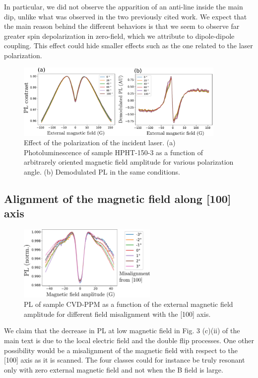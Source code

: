 \documentclass[preprintnumbers,amsmath,amssymb,onecolumn,12pt]{revtex4-2}\usepackage{graphicx}%
\begin{document}
In particular, we did not observe the apparition of an anti-line inside the main dip, unlike what was observed in the two previously cited work. We expect that the main reason behind the different behaviors is that we seem to observe far greater spin depolarization in zero-field, which we attribute to dipole-dipole coupling. This effect could hide smaller effects such as the one related to the laser polarization.
\begin{figure}[h]
\includegraphics[width=0.9\textwidth]{Figures_SI/fig_Pola}
\caption{Effect of the polarization of the incident laser. (a) Photoluminescence of sample HPHT-150-3 as a function of arbitrarely oriented magnetic field amplitude for various polarization angle. (b) Demodulated PL in the same conditions.}
\label{Pola}
\end{figure}
\subsection{Alignment of the magnetic field along [100] axis}
\begin{figure}[h]
\centering
\includegraphics[width=0.6\textwidth]{Figures_SI/alignement}
\caption{PL of sample CVD-PPM as a function of the external magnetic field amplitude for different field misalignment with the [100] axis.}
\label{Alignment}
\end{figure}
We claim that the decrease in PL at low magnetic field in Fig. 3 (c)(ii) of the main text is due to the local electric field and the double flip processes. One other possibility would be a misalignment of the magnetic field with respect to the [100] axis as it is scanned. The four classes could for instance be truly resonant only with zero external magnetic field and not when the B field is large.
\end{document}
